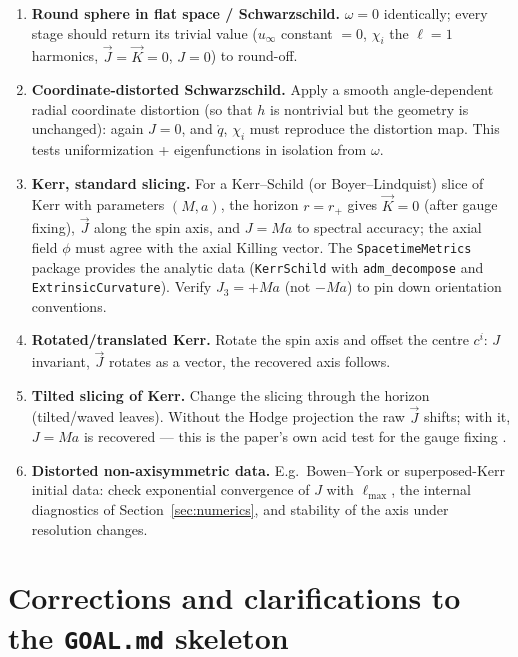\documentclass[11pt]{article}
\newcommand{\qo}{\mathring{q}}          %
\newcommand{\vJ}{\vec{J}}
\newcommand{\vK}{\vec{K}}
\begin{document}
\begin{enumerate}
\item \textbf{Round sphere in flat space / Schwarzschild.}  $\omega = 0$
  identically; every stage should return its trivial value ($u_\infty$
  constant $=0$, $\chi_i$ the $\ell=1$ harmonics, $\vJ=\vK=0$, $J = 0$) to
  round-off.
\item \textbf{Coordinate-distorted Schwarzschild.}  Apply a smooth
  angle-dependent radial coordinate distortion (so that $h$ is nontrivial
  but the geometry is unchanged): again $J=0$, and $\qo$, $\chi_i$ must
  reproduce the distortion map.  This tests uniformization + eigenfunctions
  in isolation from $\omega$.
\item \textbf{Kerr, standard slicing.}  For a Kerr--Schild (or
  Boyer--Lindquist) slice of Kerr with parameters $(M,a)$, the horizon
  $r=r_+$ gives $\vK=0$ (after gauge fixing), $\vJ$ along the spin axis,
  and $J = Ma$ to spectral accuracy; the axial field $\phi$ must agree with
  the axial Killing vector.  The \texttt{SpacetimeMetrics} package provides
  the analytic data (\texttt{KerrSchild} with \texttt{adm\_decompose} and
  \texttt{ExtrinsicCurvature}).  Verify $J_3=+Ma$ (not $-Ma$)
  to pin down orientation conventions.
\item \textbf{Rotated/translated Kerr.}  Rotate the spin axis and offset the
  centre $c^i$: $J$ invariant, $\vJ$ rotates as a vector, the recovered axis
  follows.
\item \textbf{Tilted slicing of Kerr.}  Change the slicing through the
  horizon (tilted/waved leaves).  Without the Hodge projection the raw
  $\vJ$ shifts; with it, $J=Ma$ is recovered --- this is the paper's own
  acid test for the gauge fixing \cite{korzynski2007}.
\item \textbf{Distorted non-axisymmetric data.}  E.g.\ Bowen--York or
  superposed-Kerr initial data: check exponential convergence of $J$ with
  $\ell_{\max}$, the internal diagnostics of
  Section~\ref{sec:numerics}, and stability of the axis under resolution
  changes.
\end{enumerate}

\appendix
\section{Corrections and clarifications to the \texttt{GOAL.md} skeleton}
\label{app:corrections}
\end{document}

